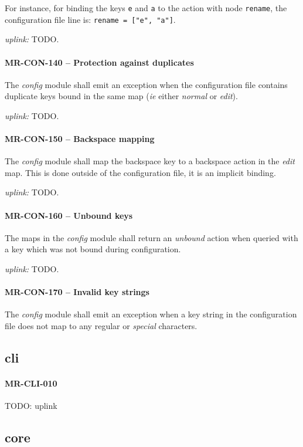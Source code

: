 For instance, for binding the keys \lstinline{e} and \lstinline{a}
to the action with node \lstinline{rename}, the configuration file
line is: \lstinline{rename = ["e", "a"]}.

\textit{uplink: } TODO.

\paragraph{MR-CON-140 -- Protection against duplicates}
The \emph{config} module shall emit an exception when the configuration
file contains duplicate keys bound in the same map (\textit{ie} either
\emph{normal} or \emph{edit}).

\textit{uplink: } TODO.

\paragraph{MR-CON-150 -- Backspace mapping}
The \emph{config} module shall map the backspace key to a backspace
action in the \emph{edit} map. This is done outside of the configuration
file, it is an implicit binding.

\textit{uplink: } TODO.

\paragraph{MR-CON-160 -- Unbound keys}
The maps in the \emph{config} module shall return an \emph{unbound}
action when queried with a key which was not bound during configuration.

\textit{uplink: } TODO.

\paragraph{MR-CON-170 -- Invalid key strings}
The \emph{config} module shall emit an exception when a key
string in the configuration file does not map to any regular or \emph{special}
characters.

\subsection{cli}
\paragraph{MR-CLI-010}
TODO: uplink

\subsection{core}
